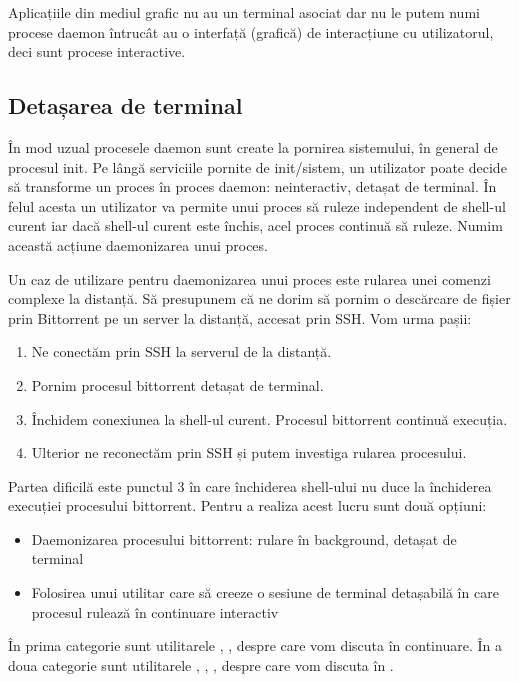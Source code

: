 Aplicațiile din mediul grafic nu au un terminal asociat dar nu le putem numi
procese daemon întrucât au o interfață (grafică) de interacțiune cu
utilizatorul, deci sunt procese interactive.

\subsection{Detașarea de terminal}
\label{sec:procese-interactivitate-detasare}

În mod uzual procesele daemon sunt create la pornirea sistemului, în general de
procesul init. Pe lângă serviciile pornite de init/sistem, un utilizator poate
decide să transforme un proces în proces daemon: neinteractiv, detașat de
terminal. În felul acesta un utilizator va permite unui proces să ruleze
independent de shell-ul curent iar dacă shell-ul curent este închis, acel proces
continuă să ruleze. Numim această acțiune daemonizarea unui proces.

Un caz de utilizare pentru daemonizarea unui proces este rularea unei comenzi
complexe la distanță. Să presupunem că ne dorim să pornim o descărcare de fișier
prin Bittorrent pe un server la distanță, accesat prin SSH. Vom urma pașii:

\begin{enumerate}
	\item Ne conectăm prin SSH la serverul de la distanță.
	\item Pornim procesul bittorrent detașat de terminal.
	\item Închidem conexiunea la shell-ul curent. Procesul bittorrent
		continuă execuția.
	\item Ulterior ne reconectăm prin SSH și putem investiga rularea
		procesului.
\end{enumerate}

Partea dificilă este punctul 3 în care închiderea shell-ului nu duce la
închiderea execuției procesului bittorrent. Pentru a realiza acest lucru sunt
două opțiuni:

\begin{itemize}
	\item Daemonizarea procesului bittorrent: rulare în background, detașat
		de terminal
	\item Folosirea unui utilitar care să creeze o sesiune de terminal
		detașabilă în care procesul rulează în continuare interactiv
\end{itemize}

În prima categorie sunt utilitarele , , despre care vom discuta în
continuare. În a doua categorie sunt utilitarele , , , 
despre care vom discuta în
.

